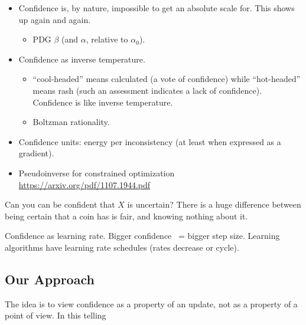 \documentclass{article}
\begin{document}
\begin{itemize}
\item 
Confidence is, by nature, impossible to get an absolute scale for. This shows up again and again. 
\begin{itemize}[nosep]
    \item PDG $\beta$ (and $\alpha$, relative to $\alpha_0$).
\end{itemize}

\item Confidence as inverse temperature.

\begin{itemize}
    \item
    ``cool-headed'' means calculated (a vote of confidence) while ``hot-headed'' means rash (such an assessment indicates a lack of confidence). Confidence is like inverse temperature.
    
    \item Boltzman rationality.
\end{itemize}


\item Confidence units: energy per inconsistency (at least when expressed as a gradient).

\item Pseudoinverse for constrained optimization \url{https://arxiv.org/pdf/1107.1944.pdf}

\end{itemize}






Can you can be confident that $X$ is uncertain?
There is a huge difference between being certain that a coin has is fair, and knowing nothing about it.







Confidence as learning rate. Bigger confidence ~= bigger step size.
Learning algorithms have learning rate schedules (rates decrease or cycle).

\subsection*{Our Approach}
The idea is to view confidence as a property of an update, not as a property of a point of view.
In this telling
\end{document}
